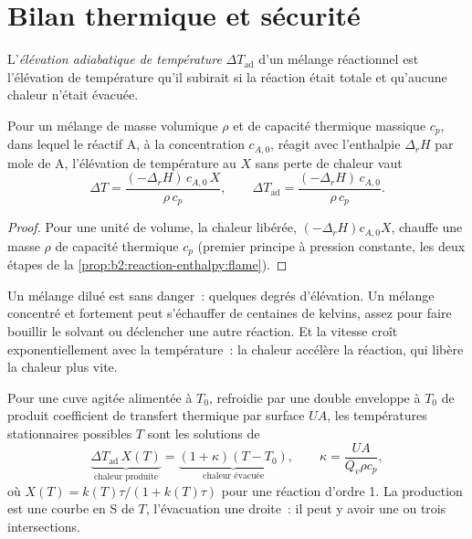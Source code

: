 \section{Bilan thermique et sécurité}

\begin{definition}\label{def:b2:continuous-reactors:adiabatic-rise}
L'\emph{élévation adiabatique de température}
$\Delta T_{\text{ad}}$ d'un mélange réactionnel est l'élévation de température qu'il
subirait si la réaction était totale et qu'aucune chaleur n'était évacuée.
\end{definition}

\begin{proposition}\label{prop:b2:continuous-reactors:adiabatic}
Pour un mélange de masse volumique $\rho$ et de capacité thermique massique $c_p$, dans lequel
le réactif A, à la concentration $c_{A,0}$, réagit avec l'enthalpie
$\Delta_r H$ par mole de A, l'élévation de température au  $X$ sans
perte de chaleur vaut
\[
  \Delta T = \frac{(-\Delta_r H)\,c_{A,0}\,X}{\rho\,c_p}, \qquad
  \Delta T_{\text{ad}} = \frac{(-\Delta_r H)\,c_{A,0}}{\rho\,c_p} .
\]
\end{proposition}

\begin{proof}
Pour une unité de volume, la chaleur libérée, $(-\Delta_r H)c_{A,0}X$, chauffe une
masse $\rho$ de capacité thermique $c_p$ (premier principe à pression constante, les deux
étapes de la \cref{prop:b2:reaction-enthalpy:flame}).
\end{proof}

Un mélange dilué est sans danger~: quelques degrés d'élévation. Un mélange concentré et fortement
 peut s'échauffer de centaines de kelvins, assez pour faire bouillir le
solvant ou déclencher une autre réaction. Et la vitesse croît exponentiellement avec la
température~: la chaleur accélère la réaction, qui libère la chaleur plus vite.

\begin{proposition}\label{prop:b2:continuous-reactors:steady-states}
Pour une cuve agitée alimentée à $T_0$, refroidie par une double enveloppe à $T_0$ de
produit coefficient de transfert thermique par surface $UA$, les températures stationnaires possibles
$T$ sont les solutions de
\[
  \underbrace{\Delta T_{\text{ad}}\,X(T)}_{\text{chaleur produite}} =
  \underbrace{(1 + \kappa)(T - T_0)}_{\text{chaleur évacuée}}, \qquad
  \kappa = \frac{UA}{Q_v\rho c_p},
\]
où $X(T) = k(T)\tau/(1 + k(T)\tau)$ pour une réaction d'ordre 1. La production est
une courbe en S de $T$, l'évacuation une droite~: il peut y avoir une ou trois
intersections.
\end{proposition}

